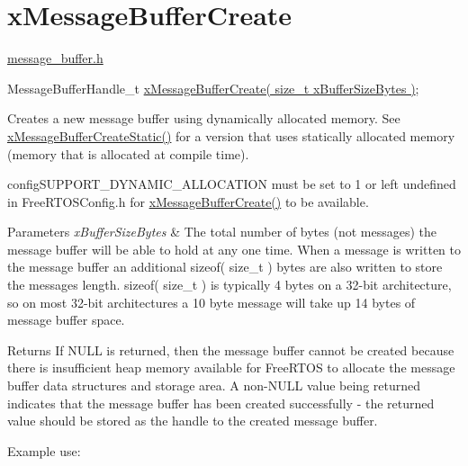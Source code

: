 \hypertarget{group__x_message_buffer_create}{}\section{x\+Message\+Buffer\+Create}
\label{group__x_message_buffer_create}
\hyperlink{message__buffer_8h}{message\+\_\+buffer.\+h}


\begin{DoxyPre}
MessageBufferHandle\_t \hyperlink{message__buffer_8h_a2959cd0e3d2bd20d46908e5c9872be36}{xMessageBufferCreate( size\_t xBufferSizeBytes )};
\end{DoxyPre}


Creates a new message buffer using dynamically allocated memory. See \hyperlink{message__buffer_8h_acc84f4a15dbd39ecbad35f7337e78b2c}{x\+Message\+Buffer\+Create\+Static()} for a version that uses statically allocated memory (memory that is allocated at compile time).

config\+S\+U\+P\+P\+O\+R\+T\+\_\+\+D\+Y\+N\+A\+M\+I\+C\+\_\+\+A\+L\+L\+O\+C\+A\+T\+I\+ON must be set to 1 or left undefined in Free\+R\+T\+O\+S\+Config.\+h for \hyperlink{message__buffer_8h_a2959cd0e3d2bd20d46908e5c9872be36}{x\+Message\+Buffer\+Create()} to be available.


\begin{DoxyParams}{Parameters}
{\em x\+Buffer\+Size\+Bytes} & The total number of bytes (not messages) the message buffer will be able to hold at any one time. When a message is written to the message buffer an additional sizeof( size\+\_\+t ) bytes are also written to store the message\textquotesingle{}s length. sizeof( size\+\_\+t ) is typically 4 bytes on a 32-\/bit architecture, so on most 32-\/bit architectures a 10 byte message will take up 14 bytes of message buffer space.\\
\hline
\end{DoxyParams}
\begin{DoxyReturn}{Returns}
If N\+U\+LL is returned, then the message buffer cannot be created because there is insufficient heap memory available for Free\+R\+T\+OS to allocate the message buffer data structures and storage area. A non-\/\+N\+U\+LL value being returned indicates that the message buffer has been created successfully -\/ the returned value should be stored as the handle to the created message buffer.
\end{DoxyReturn}
Example use\+: 
\begin{DoxyPre}\end{DoxyPre}



